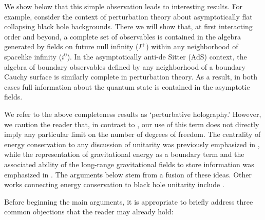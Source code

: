 \documentclass[12pt,onecolumn,eqsecnum,aps,prd,nofootinbib]{revtex4}
\begin{document}
We show below that this simple observation leads to interesting
results. For example, consider the context of perturbation
theory about asymptotically flat collapsing black
hole backgrounds.  There we will show that, at first interacting order 
and beyond, a complete set of observables is contained in
the algebra generated by fields on future null infinity ($I^+$) within any
neighborhood of spacelike infinity ($i^0$).
In the asymptotically anti-de Sitter (AdS) context,
the algebra of boundary observables defined by any neighborhood of a
boundary Cauchy surface is similarly complete in perturbation theory.  As a result, in both cases full information about the quantum state is contained in the
asymptotic fields.


We refer to the above completeness results as `perturbative holography.'  However, we caution the reader that, in contrast to \cite{Lenny}, our use of this term
does not directly imply any particular limit on the number of
degrees of freedom.  The centrality of energy conservation to any
discussion of unitarity was previously emphasized in \cite{BSP},
while the representation of gravitational energy as a boundary term
and the associated ability of the long-range gravitational fields to
store information was emphasized in \cite{BMR}.  The arguments below
stem from a fusion of these ideas.  Other works connecting
energy conservation to black hole unitarity include \cite{MP}.

Before beginning the main arguments, it is appropriate to briefly address three common objections that the reader may already hold:


\end{document}
